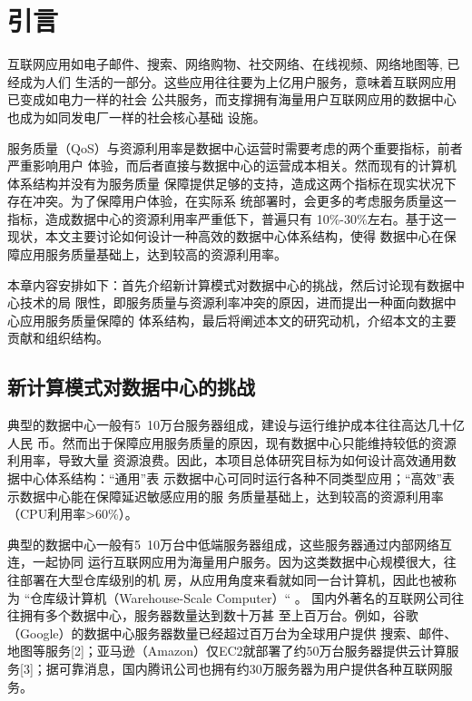 

\chapter{引言}
\label{chap:intro}

互联网应用如电子邮件、搜索、网络购物、社交网络、在线视频、网络地图等, 已经成为人们
生活的一部分。这些应用往往要为上亿用户服务，意味着互联网应用已变成如电力一样的社会
公共服务，而支撑拥有海量用户互联网应用的数据中心也成为如同发电厂一样的社会核心基础
设施。

服务质量（QoS）与资源利用率是数据中心运营时需要考虑的两个重要指标，前者严重影响用户
体验，而后者直接与数据中心的运营成本相关。然而现有的计算机体系结构并没有为服务质量
保障提供足够的支持，造成这两个指标在现实状况下存在冲突。为了保障用户体验，在实际系
统部署时，会更多的考虑服务质量这一指标，造成数据中心的资源利用率严重低下，普遍只有
10\%-30\%左右。基于这一现状，本文主要讨论如何设计一种高效的数据中心体系结构，使得
数据中心在保障应用服务质量基础上，达到较高的资源利用率。

本章内容安排如下：首先介绍新计算模式对数据中心的挑战，然后讨论现有数据中心技术的局
限性，即服务质量与资源利率冲突的原因，进而提出一种面向数据中心应用服务质量保障的
体系结构，最后将阐述本文的研究动机，介绍本文的主要贡献和组织结构。


\section{新计算模式对数据中心的挑战}

典型的数据中心一般有5~10万台服务器组成，建设与运行维护成本往往高达几十亿人民
币。然而出于保障应用服务质量的原因，现有数据中心只能维持较低的资源利用率，导致大量
资源浪费。因此，本项目总体研究目标为如何设计高效通用数据中心体系结构：“通用”表
示数据中心可同时运行各种不同类型应用；“高效”表示数据中心能在保障延迟敏感应用的服
务质量基础上，达到较高的资源利用率（CPU利用率>60\%）。

典型的数据中心一般有5~10万台中低端服务器组成，这些服务器通过内部网络互连，一起协同
运行互联网应用为海量用户服务。因为这类数据中心规模很大，往往部署在大型仓库级别的机
房，从应用角度来看就如同一台计算机，因此也被称为
“仓库级计算机（Warehouse-Scale Computer）“ \cite{WSC}。
国内外著名的互联网公司往往拥有多个数据中心，服务器数量达到数十万甚
至上百万台。例如，谷歌（Google）的数据中心服务器数量已经超过百万台为全球用户提供
搜索、邮件、地图等服务[2]；亚马逊（Amazon）仅EC2就部署了约50万台服务器提供云计算服
务[3]；据可靠消息，国内腾讯公司也拥有约30万服务器为用户提供各种互联网服务。

